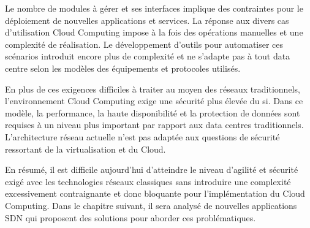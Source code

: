 Le nombre de modules à gérer et ses interfaces implique des contraintes pour le déploiement de nouvelles applications et services. La réponse aux divers cas d'utilisation Cloud Computing impose à la fois des opérations manuelles et une complexité de réalisation. Le développement d'outils pour automatiser ces scénarios introduit encore plus de complexité et ne s'adapte pas à tout data centre selon les modèles des équipements et protocoles utilisés.

En plus de ces exigences difficiles à traiter au moyen des réseaux traditionnels, l'environnement Cloud Computing exige une sécurité plus élevée du \gls{si}. Dans ce modèle, la performance, la haute disponibilité et la protection de données sont requises à un niveau plus important par rapport aux data centres traditionnels. L'architecture réseau actuelle n'est pas adaptée aux questions de sécurité ressortant de la virtualisation et du Cloud.

En résumé, il est difficile aujourd'hui d'atteindre le niveau d'agilité et sécurité exigé avec les technologies réseaux classiques sans introduire une complexité excessivement contraignante et donc bloquante pour l'implémentation du Cloud Computing. Dans le chapitre suivant, il sera analysé de nouvelles applications SDN qui proposent des solutions pour aborder ces problématiques. 